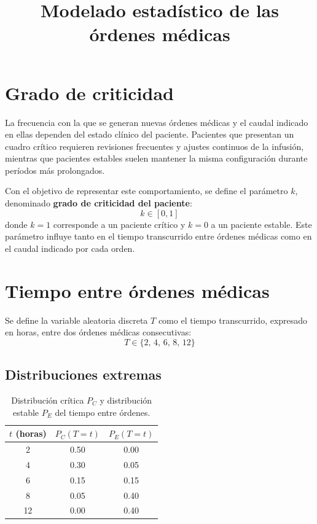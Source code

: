 \documentclass{article}
\title{Modelado estadístico de las órdenes médicas}
\date{}
\begin{document}
\maketitle

\section{Grado de criticidad}

La frecuencia con la que se generan nuevas órdenes médicas y el caudal
indicado en ellas dependen del estado clínico del paciente.
Pacientes que presentan un cuadro crítico requieren revisiones frecuentes y
ajustes continuos de la infusión, mientras que pacientes estables suelen
mantener la misma configuración durante períodos más prolongados.

Con el objetivo de representar este comportamiento, se define el parámetro
$k$, denominado \textbf{grado de criticidad del paciente}:
\[
  k \in [0,1]
\]
donde $k=1$ corresponde a un paciente crítico y $k=0$ a un paciente estable.
Este parámetro influye tanto en el tiempo transcurrido entre órdenes médicas
como en el caudal indicado por cada orden.

\section{Tiempo entre órdenes médicas}

Se define la variable aleatoria discreta $T$ como el tiempo transcurrido,
expresado en horas, entre dos órdenes médicas consecutivas:
\[
  T \in \{2,\,4,\,6,\,8,\,12\}
\]

\subsection*{Distribuciones extremas}

\begin{table}[h]
\centering
\begin{tabular}{@{}ccc@{}}
\toprule
$t$ (horas) & $P_C(T=t)$ & $P_E(T=t)$ \\
\midrule
2  & 0.50 & 0.00 \\
4  & 0.30 & 0.05 \\
6  & 0.15 & 0.15 \\
8  & 0.05 & 0.40 \\
12 & 0.00 & 0.40 \\
\bottomrule
\end{tabular}
\caption{Distribución crítica $P_C$ y distribución estable $P_E$ del tiempo entre órdenes.}
\end{table}
\end{document}
